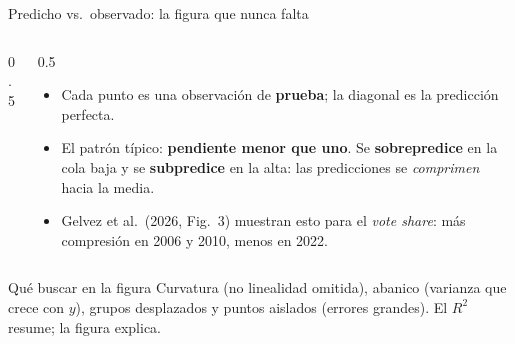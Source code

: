 \documentclass{beamer}
\newcommand{\1}{\mathbb{I}}
\begin{document}
\begin{frame}{Predicho vs.\ observado: la figura que nunca falta}
\small
\begin{columns}[T]
\begin{column}{0.5\textwidth}
\begin{center}
\end{center}
\end{column}
\begin{column}{0.5\textwidth}
\vspace{0.2cm}
\begin{itemize}\itemsep4pt
  \item Cada punto es una observación de \textbf{prueba}; la diagonal es la predicción perfecta.
  \item El patrón típico: \textbf{pendiente menor que uno}. Se \textbf{sobrepredice} en la cola baja y se \textbf{subpredice} en la alta: las predicciones se \emph{comprimen} hacia la media.
  \item Gelvez et al.\ (2026, Fig.~3) muestran esto para el \emph{vote share}: más compresión en 2006 y 2010, menos en 2022.
\end{itemize}
\end{column}
\end{columns}
\pause
\vspace{0.1cm}
\begin{block}{Qué buscar en la figura}
Curvatura (no linealidad omitida), abanico (varianza que crece con $y$), grupos desplazados y puntos aislados (errores grandes). El $R^2$ resume; la figura explica.
\end{block}
\end{frame}
\end{document}

